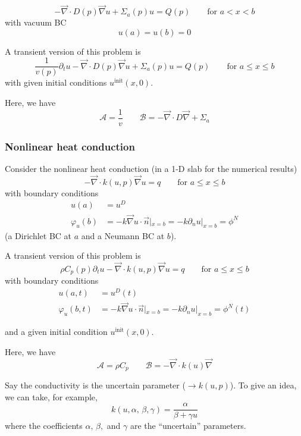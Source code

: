 \documentclass[11pt]{article}
\renewcommand{\div}{\vec{\nabla}\! \cdot \!}
\newcommand{\grad}{\vec{\nabla}}
\newcommand{\be}{\begin{equation}}
\newcommand{\ee}{\end{equation}}
\renewcommand{\O}{\mathcal{O}}
\newcommand{\mc}[1]{\mathcal{#1}}
\begin{document}
\be
-\div D(p) \grad u  + \Sigma_a(p) u = Q(p) \qquad \text{for } a<x<b
\ee
with vacuum BC
\be
u(a)=u(b)=0
\ee

A transient version of this problem is
\be
\frac{1}{v(p)} \partial_t u -\div D(p) \grad u  + \Sigma_a(p) u = Q(p) \qquad \text{for } a \le x \le b
\ee
with given initial conditions $u^{\text{init}}(x,0)$.

Here, we have
\be 
\mc{A} = \frac{1}{v} \qquad  \mc{B} =  -\div D \grad   + \Sigma_a 
\ee

\subsubsection{Nonlinear heat conduction}

Consider the nonlinear heat conduction (in a 1-D slab for the numerical results)
\be
-\div k(u,p)  \grad u = q \qquad \text{for } a \le x \le b
\label{eq:heat_conduction}
\ee
with boundary conditions
\begin{align}
u(a) &= u^D \\
\varphi_u(b) &=  -k \grad u \cdot \vec{n} |_{x=b}= -k \partial_n u |_{x=b} = \phi^N
\end{align}
(a Dirichlet BC at $a$ and a Neumann BC at $b$).

A transient version of this problem is
\be
\rho C_p(p) \partial_t u -\div k(u,p)  \grad u = q \qquad \text{for } a \le x \le b
\label{eq:heat_conduction_transient}
\ee
with boundary conditions
\begin{align}
u(a,t) &= u^D(t) \\
\varphi_u(b,t) &=  -k \grad u \cdot \vec{n} |_{x=b}= -k \partial_n u |_{x=b} = \phi^N(t)
\end{align}

and a given initial condition $u^{\text{init}}(x,0)$.

Here, we have
\be 
\mc{A} = \rho C_p \qquad  \mc{B} =  -\div k(u)  \grad
\ee

Say the conductivity is the uncertain parameter ($\longrightarrow k(u,p)$). 
To give an idea, we can take, for example, 
\be
k(u,\alpha,\,\beta,\gamma) = \frac{\alpha}{\beta + \gamma u}
\ee
where the coefficients $\alpha,\,\beta,$ and $\gamma$ are the ``uncertain'' parameters.



\end{document}

